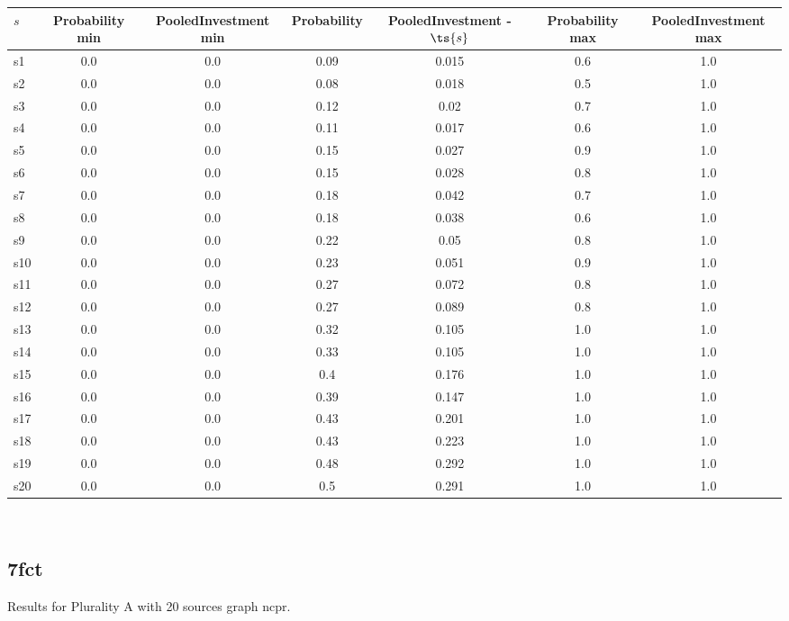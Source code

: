 \documentclass{article}
\begin{document}
\noindent\begin{tabular}{|l|c|c|c|c|c|c|}
\hline
$s$& Probability min & PooledInvestment min & Probability & PooledInvestment - $\ts{s}$ & Probability max & PooledInvestment max\\
\hline
s1 &0.0 & 0.0 & 0.09 & 0.015 & 0.6 & 1.0\\
\hline
s2 &0.0 & 0.0 & 0.08 & 0.018 & 0.5 & 1.0\\
\hline
s3 &0.0 & 0.0 & 0.12 & 0.02 & 0.7 & 1.0\\
\hline
s4 &0.0 & 0.0 & 0.11 & 0.017 & 0.6 & 1.0\\
\hline
s5 &0.0 & 0.0 & 0.15 & 0.027 & 0.9 & 1.0\\
\hline
s6 &0.0 & 0.0 & 0.15 & 0.028 & 0.8 & 1.0\\
\hline
s7 &0.0 & 0.0 & 0.18 & 0.042 & 0.7 & 1.0\\
\hline
s8 &0.0 & 0.0 & 0.18 & 0.038 & 0.6 & 1.0\\
\hline
s9 &0.0 & 0.0 & 0.22 & 0.05 & 0.8 & 1.0\\
\hline
s10 &0.0 & 0.0 & 0.23 & 0.051 & 0.9 & 1.0\\
\hline
s11 &0.0 & 0.0 & 0.27 & 0.072 & 0.8 & 1.0\\
\hline
s12 &0.0 & 0.0 & 0.27 & 0.089 & 0.8 & 1.0\\
\hline
s13 &0.0 & 0.0 & 0.32 & 0.105 & 1.0 & 1.0\\
\hline
s14 &0.0 & 0.0 & 0.33 & 0.105 & 1.0 & 1.0\\
\hline
s15 &0.0 & 0.0 & 0.4 & 0.176 & 1.0 & 1.0\\
\hline
s16 &0.0 & 0.0 & 0.39 & 0.147 & 1.0 & 1.0\\
\hline
s17 &0.0 & 0.0 & 0.43 & 0.201 & 1.0 & 1.0\\
\hline
s18 &0.0 & 0.0 & 0.43 & 0.223 & 1.0 & 1.0\\
\hline
s19 &0.0 & 0.0 & 0.48 & 0.292 & 1.0 & 1.0\\
\hline
s20 &0.0 & 0.0 & 0.5 & 0.291 & 1.0 & 1.0\\
\hline
\end{tabular}\\

\newpage

\subsection{7fct}

\noindent Results for Plurality A with 20 sources graph ncpr.
\end{document}
